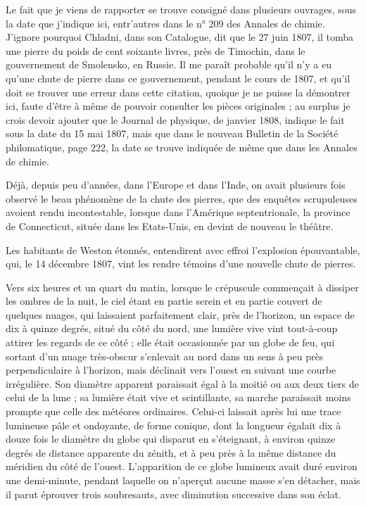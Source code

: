 \documentclass[a4paper, 12pt, oneside, french]{article}
\begin{document}
Le fait que je viens de rapporter se trouve consigné dans plusieurs ouvrages, sous la date que j'indique ici, entr'autres dans le n° 209 des Annales de chimie. J'ignore pourquoi Chladni, dans son Catalogue, dit que le 27 juin 1807, il tomba une pierre du poids de cent soixante livres, près de Timochin, dans le gouvernement de Smolensko, en Russie. Il me paraît probable qu'il n'y a eu qu'une chute de pierre dans ce gouvernement, pendant le cours de 1807, et qu'il doit se trouver une erreur dans cette citation, quoique je ne puisse la démontrer ici, faute d'être à même de pouvoir consulter les pièces originales ; au surplus je crois devoir ajouter que le Journal de physique, de janvier 1808, indique le fait sous la date du 15 mai 1807, mais que dans le nouveau Bulletin de la Société philomatique, page 222, la date se trouve indiquée de même que dans les Annales de chimie.

Déjà, depuis peu d'années, dans l'Europe et dans l'Inde, on avait plusieurs fois observé le beau phénomène de la chute des pierres, que des enquêtes scrupuleuses avoient rendu incontestable, lorsque dans l'Amérique septentrionale, la province de Connecticut, située dans les Etats-Unis, en devint de nouveau le théâtre.

Les habitants de Weston étonnés, entendirent avec effroi l'explosion épouvantable, qui, le 14 décembre 1807, vint les rendre témoins d'une nouvelle chute de pierres.

Vers six heures et un quart du matin, lorsque le crépuscule commençait à dissiper les ombres de la nuit, le ciel étant en partie serein et en partie couvert de quelques nuages, qui laissaient parfaitement clair, près de l'horizon, un espace de dix à quinze degrés, situé du côté du nord, une lumière vive vint tout-à-coup attirer les regards de ce côté ; elle était occasionnée par un globe de feu, qui sortant d'un nuage très-obscur s'enlevait au nord dans un sens à peu près perpendiculaire à l'horizon, mais déclinait vers l'ouest en suivant une courbe irrégulière. Son diamètre apparent paraissait égal à la moitié ou aux deux tiers de celui de la lune ; sa lumière était vive et scintillante, sa marche paraissait moins prompte que celle des météores ordinaires. Celui-ci laissait après lui une trace lumineuse pâle et ondoyante, de forme conique, dont la longueur égalait dix à douze fois le diamètre du globe qui disparut en s'éteignant, à environ quinze degrés de distance apparente du zénith, et à peu près à la même distance du méridien du côté de l'ouest. L'apparition de ce globe lumineux avait duré environ une demi-minute, pendant laquelle on n'aperçut aucune masse s'en détacher, mais il parut éprouver trois soubresauts, avec diminution successive dans son éclat.
\end{document}
